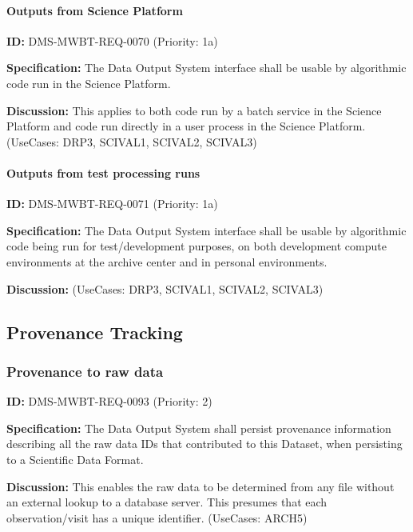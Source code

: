 \documentclass[SE,toc,lsstdraft]{lsstdoc}
\begin{document}
\paragraph{Outputs from Science Platform}\hfill  %

\label{DMS-MWBT-REQ-0070}
\textbf{ID:} DMS-MWBT-REQ-0070 (Priority: 1a)

\textbf{Specification:}
The Data Output System interface shall be usable by algorithmic code run in the Science Platform.

\textbf{Discussion:}
This applies to both code run by a batch service in the Science Platform and code run directly in a user process in the Science Platform. (UseCases: DRP3, SCIVAL1, SCIVAL2, SCIVAL3)

\paragraph{Outputs from test processing runs}\hfill  %

\label{DMS-MWBT-REQ-0071}
\textbf{ID:} DMS-MWBT-REQ-0071 (Priority: 1a)

\textbf{Specification:}
The Data Output System interface shall be usable by algorithmic code being run for test/development purposes, on both development compute environments at the archive center and in personal environments.

\textbf{Discussion:}
(UseCases: DRP3, SCIVAL1, SCIVAL2, SCIVAL3)

\subsection{Provenance Tracking}

\subsubsection{Provenance to raw data}

\label{DMS-MWBT-REQ-0093}
\textbf{ID:} DMS-MWBT-REQ-0093 (Priority: 2)

\textbf{Specification:}
The Data Output System shall persist provenance information describing all the raw data IDs that contributed to this Dataset, when persisting to a Scientific Data Format.

\textbf{Discussion:}
This enables the raw data to be determined from any file without an external lookup to a database server. This presumes that each observation/visit has a unique identifier. (UseCases: ARCH5)
\end{document}
